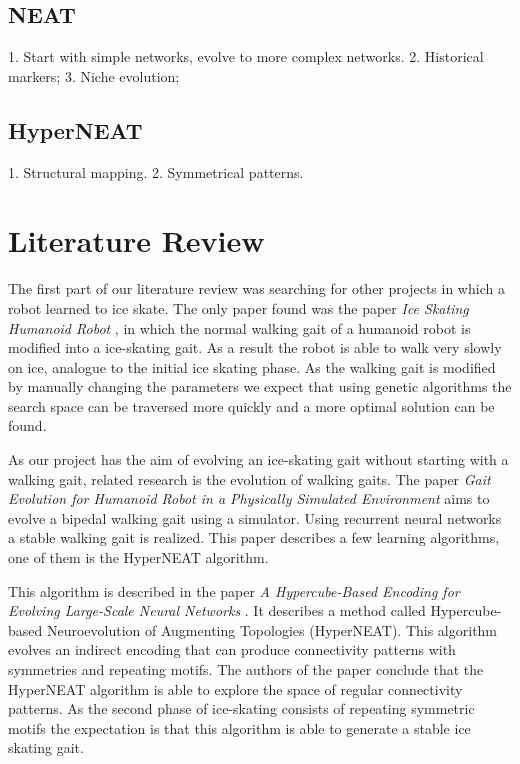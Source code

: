 \documentclass[10pt]{article}
\begin{document}
\subsection{NEAT}
1. Start with simple networks, evolve to more complex networks.
2. Historical markers;
3. Niche evolution;

\subsection{HyperNEAT}
1. Structural mapping.
2. Symmetrical patterns.

\section{Literature Review}
The first part of our literature review was searching for other projects in which a robot learned to ice skate. The only paper found was the paper \emph{Ice Skating Humanoid Robot} \cite{springerlink:10.1007/978-3-642-32527-4_19}, in which the normal walking gait of a humanoid robot is modified into a ice-skating gait. As a result the robot is able to walk very slowly on ice, analogue to the initial ice skating phase. As the walking gait is modified by manually changing the parameters we expect that using genetic algorithms the search space can be traversed more quickly and a more optimal solution can be found.

As our project has the aim of evolving an ice-skating gait without starting with a walking gait, related research is the evolution of walking gaits. The paper \emph{Gait Evolution for Humanoid Robot in a Physically Simulated Environment} \cite{springerlink:10.1007/978-3-642-22907-7_9} aims to evolve a bipedal walking gait using a simulator. Using recurrent neural networks a stable walking gait is realized. This paper describes a few learning algorithms, one of them is the HyperNEAT algorithm.

This algorithm is described in the paper \emph{A Hypercube-Based Encoding for Evolving Large-Scale Neural Networks} \cite{mitpress:hypercubebasedencoding}. It describes a method called Hypercube-based Neuroevolution of Augmenting Topologies (HyperNEAT). This algorithm evolves an indirect encoding that can produce connectivity patterns with symmetries and repeating motifs. The authors of the paper conclude that the HyperNEAT algorithm is able to explore the space of regular connectivity patterns. As the second phase of ice-skating consists of repeating symmetric motifs the expectation is that this algorithm is able to generate a stable ice skating gait.
\end{document}
